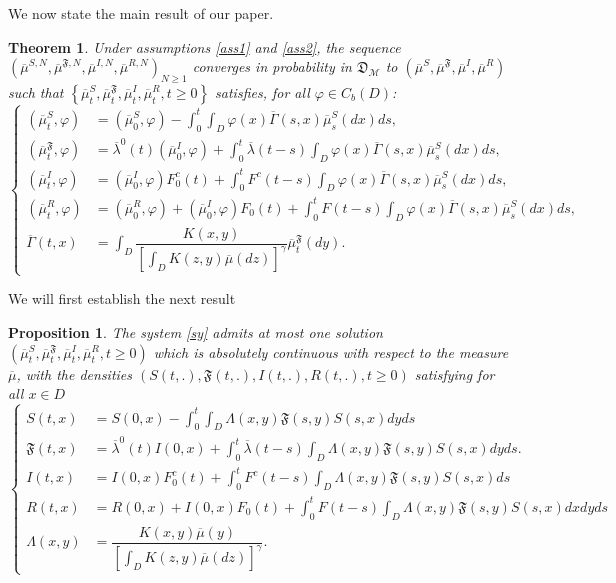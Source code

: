 \documentclass[notitlepage,reqno,11pt]{amsart}
\numberwithin{equation}{section}
\newtheorem{theorem}{Theorem}[section]
\newtheorem{propo}{Proposition}[section]
\begin{document}
We now state the main result of our paper.
\begin{theorem}
	\label{theo1}
	Under assumptions \ref{ass1} and \ref{ass2}, the sequence $(\overline{\mu}^{S,N}, \overline{\mu}^{\mathfrak{F},N},\overline{\mu}^{I,N},\overline{\mu}^{R,N})_{N \geq 1}$ converges in probability in $\mathfrak{D}_{\mathcal{M}}$  to $(\overline{\mu}^{S}, \overline{\mu}^{\mathfrak{F}},\overline{\mu}^{I},\overline{\mu}^{R})$ such that  $\left\{ \overline{\mu}^S_t, \overline{\mu}^{\mathfrak{F}}_t, \overline{\mu}^I_t, \overline{\mu}^R_t,   t\geq 0\right\}$  satisfies, for all $\varphi \in C_b(D)$:
	\begin{equation}
	\label{sy}
	\left\lbrace
	\begin{aligned}
	(\overline{\mu}_t^{S},\varphi)&= (\overline{\mu}_0^{S},\varphi)- \int_0^t\int_{D}\varphi(x)\overline{\Gamma}(s,x)\overline{\mu}_s^{S}(dx)ds,\\
	(\overline{\mu}_t^{\mathfrak{F}},\varphi) &=\overline{\lambda}^0(t)(\overline{\mu}^I_0,\varphi)+\int_0^t\overline{\lambda}(t-s)\int_{D}\varphi(x)\overline{\Gamma}(s,x)\overline{\mu}_s^{S}(dx)ds,\\
	(\overline{\mu}_t^{I},\varphi)&= (\overline{\mu}_0^{I},\varphi)F_0^c(t)+\int_0^tF^c(t-s)\int_{D} \varphi (x)\overline{\Gamma}(s,x)\overline{\mu}_s^S(dx)ds,\\
	(\overline{\mu}_t^{R},\varphi)&=(\overline{\mu}_0^{R},\varphi)+ (\overline{\mu}_0^{I},\varphi)F_0(t)+\int_0^t F(t-s) \int_{D} \varphi (x)\overline{\Gamma}(s,x)\overline{\mu}_s^S(dx)ds,\\
	\overline{\Gamma}(t,x)&=\int_{D} \dfrac{K(x,y)}{\left[\displaystyle\int_{D}K(z,y)\overline{\mu}(dz) \right]^{\gamma}}\overline{\mu}_t^{\mathfrak{F}}(dy).
	\end{aligned}
	\right.
	\end{equation}	
\end{theorem}
We will first establish the next result 
\begin{propo}
	\label{oo}
	The  system \eqref{sy} admits at most one  solution  $\left(\overline{\mu}^S_t,\overline{\mu}_t^{\mathfrak{F}},\overline{\mu}_t^{I},\overline{\mu}_t^{R}, t \geq 0\right)$   which is absolutely continuous with respect to the measure $\overline{\mu}$, with the densities $\left(S(t,.),\mathfrak{F}(t,.),I(t,.) ,R(t,.), t\geq 0\right)$ satisfying for all $x\in D$
	\begin{equation}
	\label{syste}
	\left\lbrace
	\begin{aligned}
	S(t,x)&= S(0,x)- \int_0^t\int_{D} \Lambda(x,y)\mathfrak{F}(s,y)S(s,x)dyds\\
	\mathfrak{F}(t,x) &=\overline{\lambda}^0(t)I(0,x)+\int_0^t\overline{\lambda}(t-s)\int_{D} \Lambda(x,y)\mathfrak{F}(s,y)S(s,x)dyds.\\
	I(t,x)&= I(0,x)F_0^c(t)+\int_0^t F^c(t-s)\int_{D} \Lambda(x,y)\mathfrak{F}(s,y)S(s,x)ds\\
	R(t,x)&= R(0,x)+I(0,x)F_0(t)+\int_0^tF(t-s) \int_{D} \Lambda(x,y)\mathfrak{F}(s,y)S(s,x)dxdyds\\
\Lambda(x,y)&=\dfrac{K(x,y)\overline{\mu}(y)}{\left[\displaystyle\int_{D}K(z,y)\overline{\mu}(dz) \right]^{\gamma}}.
	\end{aligned}
	\right.
	\end{equation}
\end{propo}
\end{document}
